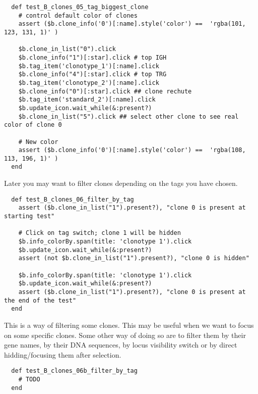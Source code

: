 \begin{verbatim}
  def test_B_clones_05_tag_biggest_clone
    # control default color of clones
    assert ($b.clone_info('0')[:name].style('color') ==  'rgba(101, 123, 131, 1)' )

    $b.clone_in_list("0").click
    $b.clone_info("1")[:star].click # top IGH
    $b.tag_item('clonotype_1')[:name].click
    $b.clone_info("4")[:star].click # top TRG 
    $b.tag_item('clonotype_2')[:name].click
    $b.clone_info("0")[:star].click ## clone rechute
    $b.tag_item('standard_2')[:name].click
    $b.update_icon.wait_while(&:present?)
    $b.clone_in_list("5").click ## select other clone to see real color of clone 0

    # New color
    assert ($b.clone_info('0')[:name].style('color') ==  'rgba(108, 113, 196, 1)' )
  end
\end{verbatim}

Later you may want to filter clones depending on the tags you have chosen.


\begin{verbatim}
  def test_B_clones_06_filter_by_tag
    assert ($b.clone_in_list("1").present?), "clone 0 is present at starting test"

    # Click on tag switch; clone 1 will be hidden
    $b.info_colorBy.span(title: 'clonotype 1').click
    $b.update_icon.wait_while(&:present?)
    assert (not $b.clone_in_list("1").present?), "clone 0 is hidden"

    $b.info_colorBy.span(title: 'clonotype 1').click
    $b.update_icon.wait_while(&:present?)
    assert ($b.clone_in_list("1").present?), "clone 0 is present at the end of the test"
  end
\end{verbatim}

This is a way of filtering some clones. This may be useful when we want to
focus on some specific clones. Some other way of doing so are to filter them by
their gene names, by their DNA sequences, 
by locus visibility switch
or by direct hidding/focusing them after selection.


\begin{verbatim}
  def test_B_clones_06b_filter_by_tag
    # TODO
  end
\end{verbatim}

